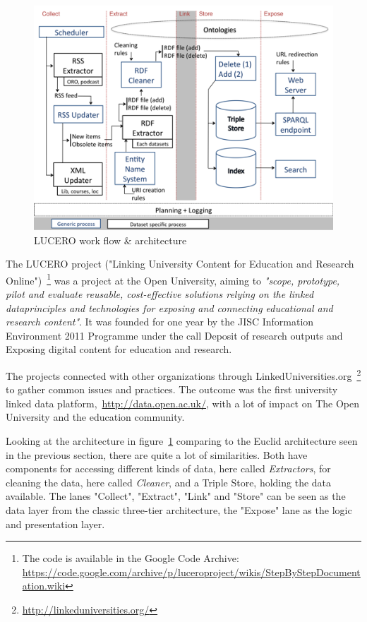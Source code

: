 
\begin{figure}[ht]
	\centering
\includegraphics[width=\textwidth]{img/lucero_architecture.png}
	\caption{LUCERO work flow \& architecture}
	\label{lucero_architecture}
\end{figure}

The LUCERO project ("Linking University Content for Education and Research Online")~\footnote{The code is available in the Google Code Archive: \url{https://code.google.com/archive/p/luceroproject/wikis/StepByStepDocumentation.wiki}} was a project at the Open University, aiming to \emph{"scope, prototype, pilot and evaluate reusable, cost-effective solutions relying on the linked dataprinciples and technologies for exposing and connecting educational and research content"}. It was founded for one year by the JISC Information Environment 2011 Programme under the call Deposit of research outputs and Exposing digital content for education and research.~\cite{lucero:about}

The projects connected with other organizations through LinkedUniversities.org~\footnote{\url{http://linkeduniversities.org/}} to gather common issues and practices. The outcome was the first university linked data platform,~\url{http://data.open.ac.uk/}, with a lot of impact on The Open University and the education community.

Looking at the architecture in figure~\ref{lucero_architecture} comparing to the Euclid architecture seen in the previous section, there are quite a lot of similarities. Both have components for accessing different kinds of data, here called \emph{Extractors}, for cleaning the data, here called \emph{Cleaner}, and a Triple Store, holding the data available. The lanes "Collect", "Extract", "Link" and "Store" can be seen as the data layer from the classic three-tier architecture, the "Expose" lane as the logic and presentation layer. 

